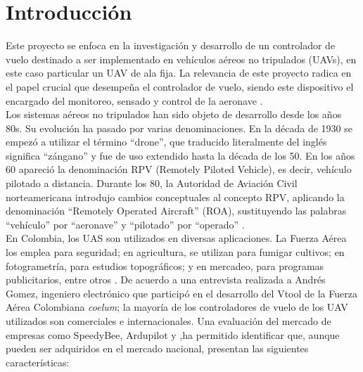\section{Introducción }
\vspace{5 px}


Este proyecto se enfoca en la investigación y desarrollo de un controlador de vuelo destinado a ser implementado en vehículos aéreos no tripulados (UAVs), en este caso particular un UAV de ala fija. La relevancia de este proyecto radica en el papel crucial que desempeña el controlador de vuelo, siendo este dispositivo el encargado del monitoreo, sensado y control de la aeronave \cite{justin}. \\


Los sistemas aéreos no tripulados han sido objeto de desarrollo desde los años 80s. Su evolución ha pasado por varias denominaciones. En la década de 1930 se empezó a utilizar el término “drone”, que traducido literalmente del inglés significa “zángano” y fue de uso extendido hasta la década de los 50. En los años 60 apareció la denominación RPV (Remotely Piloted Vehicle), es decir, vehículo pilotado a distancia. Durante los 80, la Autoridad de Aviación Civil norteamericana introdujo cambios conceptuales al concepto RPV, aplicando la denominación “Remotely Operated Aircraft” (ROA), sustituyendo las palabras “vehículo” por “aeronave” y “pilotado” por “operado” \cite{UAS-FAC}.\\

En Colombia, los UAS son utilizados en diversas aplicaciones. La Fuerza Aérea los emplea para seguridad; en agricultura, se utilizan para fumigar cultivos; en fotogrametría, para estudios topográficos; y en mercadeo, para programas publicitarios, entre otros \cite{UAgriculture}. De acuerdo a una entrevista realizada a Andrés Gomez, ingeniero electrónico que participó en el desarrollo del Vtool de la Fuerza Aérea Colombiana \textit{coelum}; la mayoría de los controladores de vuelo de los UAV utilizados son comerciales e internacionales. Una evaluación del mercado de empresas como SpeedyBee, Ardupilot y  ,ha permitido identificar que, aunque pueden ser adquiridos en el mercado nacional, presentan las siguientes características:\\

